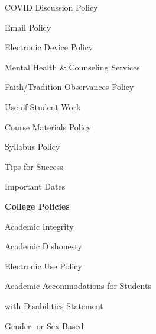 \documentclass[11pt,letterpaper]{article}
\begin{document}
\begin{minipage}[t]{0.45\textwidth}
\hspace{0.3cm} COVID Discussion Policy \dotfill \pageref{covid_disc} \par
\hspace{0.3cm} Email Policy \dotfill \pageref{email_policy} \par
\hspace{0.3cm} Electronic Device Policy \dotfill \pageref{electronic} \par
%
\end{minipage}\hfill\begin{minipage}[t]{0.45\textwidth} \par
\hspace{0.3cm} Mental Health \& Counseling Services \dotfill \pageref{mental_health} \par
\hspace{0.3cm} Faith/Tradition Observances Policy \dotfill \pageref{faith} \par
\hspace{0.3cm} Use of Student Work \dotfill \pageref{std_work} \par
\hspace{0.3cm} Course Materials Policy \dotfill \pageref{copyright} \par
\hspace{0.3cm} Syllabus Policy \dotfill \pageref{syllabus} \par
\hspace{0.3cm} Tips for Success \dotfill \pageref{tips} \par
\hspace{0.3cm} Important Dates \dotfill \pageref{imp_dates} \par
{\bfseries\color{stacred} College Policies} \dotfill \pageref{college_polc} \par
\hspace{0.3cm} Academic Integrity \dotfill \pageref{college_acadint} \par
\hspace{0.3cm} Academic Dishonesty \dotfill \pageref{college_acaddis} \par
\hspace{0.3cm} Electronic Use Policy \dotfill \pageref{college_elecuse} \par
\hspace{0.3cm} Academic Accommodations for Students \par
\hspace{0.6cm} with Disabilities Statement \dotfill \pageref{college_acadacc} \par
\hspace{0.3cm} Gender- or Sex-Based \par

\end{minipage}
\end{document}
